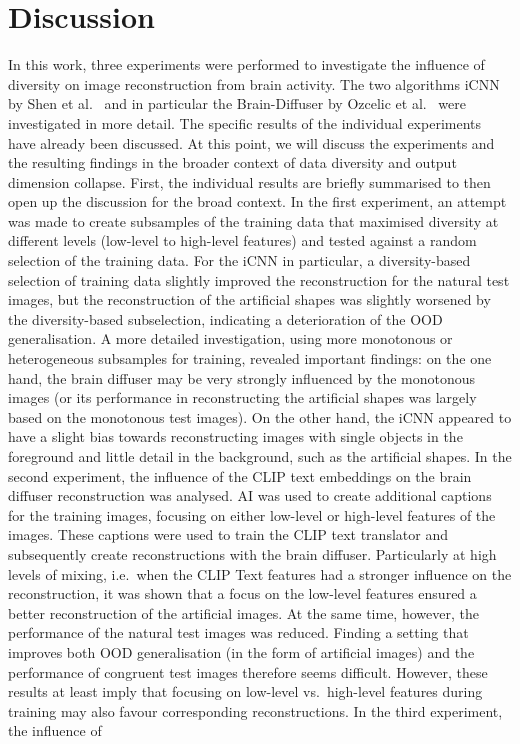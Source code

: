 \chapter{Discussion}


In this work, three experiments were performed to investigate the influence of diversity on image reconstruction from brain activity. The two algorithms iCNN by Shen et al.~\cite{shenDeepImageReconstruction2019} and in particular the Brain-Diffuser by Ozcelic et al.~\cite{ozcelikNaturalSceneReconstruction2023} were investigated in more detail. The specific results of the individual experiments have already been discussed. At this point, we will discuss the experiments and the resulting findings in the broader context of data diversity and output dimension collapse. First, the individual results are briefly summarised to then open up the discussion for the broad context. In the first experiment, an attempt was made to create subsamples of the training data that maximised diversity at different levels (low-level to high-level features) and tested against a random selection of the training data. For the iCNN in particular, a diversity-based selection of training data slightly improved the reconstruction for the natural test images, but the reconstruction of the artificial shapes was slightly worsened by the diversity-based subselection, indicating a deterioration of the OOD generalisation. A more detailed investigation, using more monotonous or heterogeneous subsamples for training, revealed important findings: on the one hand, the brain diffuser may be very strongly influenced by the monotonous images (or its performance in reconstructing the artificial shapes was largely based on the monotonous test images). On the other hand, the iCNN appeared to have a slight bias towards reconstructing images with single objects in the foreground and little detail in the background, such as the artificial shapes. In the second experiment, the influence of the CLIP text embeddings on the brain diffuser reconstruction was analysed. AI was used to create additional captions for the training images, focusing on either low-level or high-level features of the images. These captions were used to train the CLIP text translator and subsequently create reconstructions with the brain diffuser. Particularly at high levels of mixing, i.e.\ when the CLIP Text features had a stronger influence on the reconstruction, it was shown that a focus on the low-level features ensured a better reconstruction of the artificial images. At the same time, however, the performance of the natural test images was reduced. Finding a setting that improves both OOD generalisation (in the form of artificial images) and the performance of congruent test images therefore seems difficult. However, these results at least imply that focusing on low-level vs.\ high-level features during training may also favour corresponding reconstructions. In the third experiment, the influence of 
